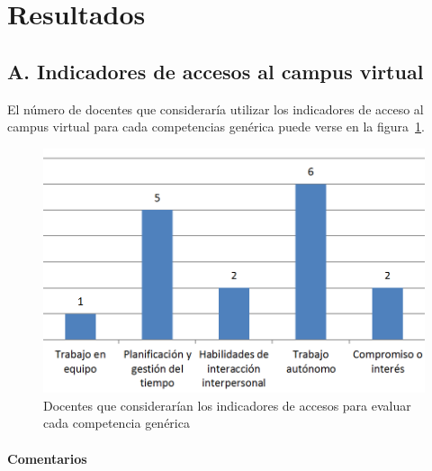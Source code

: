 \section{Resultados} \label{ape:AA:resultados}

	\subsection*{A. Indicadores de accesos al campus virtual}

El número de docentes que consideraría utilizar los indicadores de acceso al campus virtual para cada competencias genérica puede verse en la figura~\ref{fig:ape:aa:accesos}.

\begin{figure}[h]
    \includegraphics[scale=0.45]{aa_accesos.png}
  \caption{Docentes que considerarían los indicadores de accesos para evaluar cada competencia genérica}
  \label{fig:ape:aa:accesos}
\end{figure}

\paragraph*{Comentarios}

